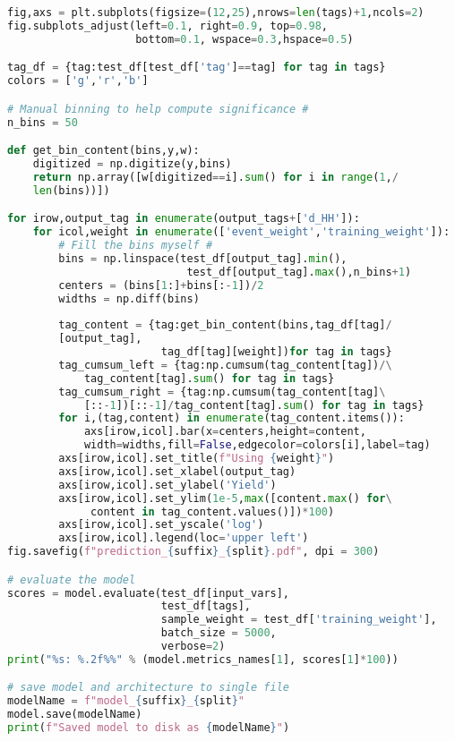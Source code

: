 \begin{lstlisting}[language=Python, caption=DNN setup for the \wwgg semi-leptonic final state, label={dnncode}]
fig,axs = plt.subplots(figsize=(12,25),nrows=len(tags)+1,ncols=2)
fig.subplots_adjust(left=0.1, right=0.9, top=0.98,
                    bottom=0.1, wspace=0.3,hspace=0.5)

tag_df = {tag:test_df[test_df['tag']==tag] for tag in tags}
colors = ['g','r','b']

# Manual binning to help compute significance #
n_bins = 50

def get_bin_content(bins,y,w):
    digitized = np.digitize(y,bins)
    return np.array([w[digitized==i].sum() for i in range(1,/
    len(bins))])

for irow,output_tag in enumerate(output_tags+['d_HH']):
    for icol,weight in enumerate(['event_weight','training_weight']):
        # Fill the bins myself #
        bins = np.linspace(test_df[output_tag].min(),
                            test_df[output_tag].max(),n_bins+1)
        centers = (bins[1:]+bins[:-1])/2
        widths = np.diff(bins)
        
        tag_content = {tag:get_bin_content(bins,tag_df[tag]/
        [output_tag],
                        tag_df[tag][weight])for tag in tags}
        tag_cumsum_left = {tag:np.cumsum(tag_content[tag])/\
            tag_content[tag].sum() for tag in tags}
        tag_cumsum_right = {tag:np.cumsum(tag_content[tag]\
            [::-1])[::-1]/tag_content[tag].sum() for tag in tags}
        for i,(tag,content) in enumerate(tag_content.items()):
            axs[irow,icol].bar(x=centers,height=content,
            width=widths,fill=False,edgecolor=colors[i],label=tag)     
        axs[irow,icol].set_title(f"Using {weight}")
        axs[irow,icol].set_xlabel(output_tag)
        axs[irow,icol].set_ylabel('Yield')
        axs[irow,icol].set_ylim(1e-5,max([content.max() for\
             content in tag_content.values()])*100)
        axs[irow,icol].set_yscale('log')
        axs[irow,icol].legend(loc='upper left')
fig.savefig(f"prediction_{suffix}_{split}.pdf", dpi = 300)

# evaluate the model
scores = model.evaluate(test_df[input_vars], 
                        test_df[tags], 
                        sample_weight = test_df['training_weight'], 
                        batch_size = 5000,
                        verbose=2)
print("%s: %.2f%%" % (model.metrics_names[1], scores[1]*100))

# save model and architecture to single file
modelName = f"model_{suffix}_{split}"
model.save(modelName)
print(f"Saved model to disk as {modelName}")
\end{lstlisting}